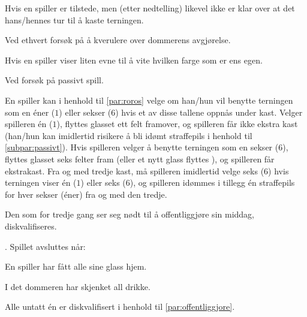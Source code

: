 \begin{ludol}
\begin{ludol}
  \item Hvis en spiller er tilstede, men (etter nedtelling) likevel ikke er klar
    over at det hans/hennes tur til å kaste terningen.

  \item Ved ethvert forsøk på å kverulere over dommerens avgjørelse.

  \item Hvis en spiller viser liten evne til å vite hvilken farge som er ens
    egen.

  \item \label{subpar:passivt} Ved forsøk på passivt spill.

  \end{ludol}

\item \label{par:sekser-regelen} En spiller kan i henhold til \cref{par:roros}
  velge om han/hun vil benytte terningen som en éner ($1$) eller sekser ($6$)
  hvis et av disse tallene oppnås under kast. Velger spilleren én ($1$), flyttes
  glasset ett felt framover, og spilleren får ikke ekstra kast (han/hun kan
  imidlertid risikere å bli idømt straffepils i henhold til
  \cref{subpar:passivt}). Hvis spilleren velger å benytte terningen som en
  sekser ($6$), flyttes glasset seks felter fram (eller et nytt glass flyttes
  ), og spilleren får ekstrakast. Fra og med tredje kast, må
  spilleren imidlertid velge seks ($6$) hvis terningen viser én ($1$) eller seks
  ($6$), og spilleren idømmes i tillegg én straffepils for hver sekser (éner)
  fra og med den tredje.

\item \label{par:offentliggjore} Den som for tredje gang ser seg nødt til å
  offentliggjøre sin middag, diskvalifiseres.

\item \label{par:avsluttes}. Spillet avsluttes når:

  \begin{ludol}

  \item \label{subpar:hjem} En spiller har fått alle sine glass hjem.

  \item \label{subpar:tom} I det dommeren har skjenket all drikke.

  \item \label{subpar:middag} Alle untatt én er diskvalifisert i henhold til
    \cref{par:offentliggjore}.

  \end{ludol}


\end{ludol}
